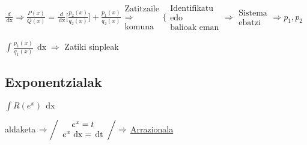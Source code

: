 \documentclass[8pt]{article}
\DeclareMathOperator{\xder}{\, \mathrm{d}x}
\DeclareMathOperator{\tder}{\, \mathrm{d}t}
\begin{document}
			$ \frac{d}{\xder} \Rightarrow \frac{P(x)}{Q(x)} = \frac{d}{\xder} 
				\Big[ \frac{p_2 (x)}{q_2 (x)} \Big] + \frac{p_1 (x)}{q_2 (x)}
				\begin{array}{c}
					\text{Zatitzaile}\\
					\Rightarrow\\
					\text{komuna}
				\end{array}
				\Bigg \{
				\begin{array}{c}
					\text{Identifikatu}\\
					\text{edo}\\
					\text{balioak eman}
				\end{array}
				\Rightarrow
				\begin{array}{c}
					\text{Sistema}\\
					\text{ebatzi}
				\end{array} \Rightarrow p_1 , p_2 $

				$ \int \frac{p_1 (x)}{q_1 (x)} \xder \Rightarrow $ Zatiki sinpleak

	\subsection{Exponentzialak}
		$ \int R (e^x) \xder $

			aldaketa $ \Rightarrow
			\left/
				\begin{array}{c}
					e^x = t\\
					e^x \xder = \tder
				\end{array}
			\right/
			\Rightarrow $ \underline{Arrazionala}
\end{document}

